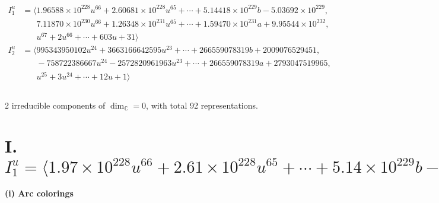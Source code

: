 \documentclass[1p]{elsarticle_modified}
\theoremstyle{definition}
\begin{document}
\begin{align*}
I^u_{1}&=\langle 
1.96588\times10^{228} u^{66}+2.60681\times10^{228} u^{65}+\cdots+5.14418\times10^{229} b-5.03692\times10^{229},\\
\phantom{I^u_{1}}&\phantom{= \langle  }7.11870\times10^{230} u^{66}+1.26348\times10^{231} u^{65}+\cdots+1.59470\times10^{231} a+9.95544\times10^{232},\\
\phantom{I^u_{1}}&\phantom{= \langle  }u^{67}+2 u^{66}+\cdots+603 u+31\rangle \\
I^u_{2}&=\langle 
995343950102 u^{24}+3663166642595 u^{23}+\cdots+266559078319 b+2009076529451,\\
\phantom{I^u_{2}}&\phantom{= \langle  }-758722386667 u^{24}-2572820961963 u^{23}+\cdots+266559078319 a+2793047519965,\\
\phantom{I^u_{2}}&\phantom{= \langle  }u^{25}+3 u^{24}+\cdots+12 u+1\rangle \\
\\
\end{align*}
\raggedright * 2 irreducible components of $\dim_{\mathbb{C}}=0$, with total 92 representations.\\
\newpage
\renewcommand{\arraystretch}{1}
\centering \section*{I. $I^u_{1}= \langle 1.97\times10^{228} u^{66}+2.61\times10^{228} u^{65}+\cdots+5.14\times10^{229} b-5.04\times10^{229},\;7.12\times10^{230} u^{66}+1.26\times10^{231} u^{65}+\cdots+1.59\times10^{231} a+9.96\times10^{232},\;u^{67}+2 u^{66}+\cdots+603 u+31 \rangle$}
\flushleft \textbf{(i) Arc colorings}\\
\end{document}
